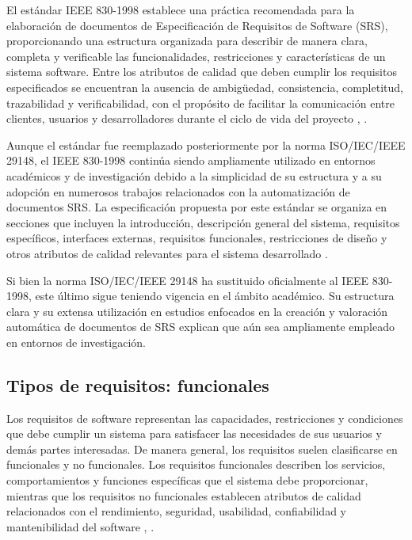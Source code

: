 El estándar IEEE 830-1998 establece una práctica recomendada para la elaboración de documentos de Especificación de Requisitos de Software (SRS), 
proporcionando una estructura organizada para describir de manera clara, completa y verificable las funcionalidades, restricciones y características 
de un sistema software. Entre los atributos de calidad que deben cumplir los requisitos especificados se encuentran la ausencia de ambigüedad, 
consistencia, completitud, trazabilidad y verificabilidad, con el propósito de facilitar la comunicación entre clientes, usuarios y desarrolladores 
durante el ciclo de vida del proyecto \cite{Umar2024}, \cite{Wolf2026}.

Aunque el estándar fue reemplazado posteriormente por la norma ISO/IEC/IEEE 29148, el IEEE 830-1998 continúa siendo ampliamente utilizado en entornos 
académicos y de investigación debido a la simplicidad de su estructura y a su adopción en numerosos trabajos relacionados con la automatización 
de documentos SRS. La especificación propuesta por este estándar se organiza en secciones que incluyen la introducción, descripción general del 
sistema, requisitos específicos, interfaces externas, requisitos funcionales, restricciones de diseño y otros atributos de calidad relevantes para 
el sistema desarrollado \cite{Akhtar2025}.

Si bien la norma ISO/IEC/IEEE 29148 ha sustituido oficialmente al IEEE 830-1998, este último sigue teniendo vigencia en el ámbito académico. 
Su estructura clara y su extensa utilización en estudios enfocados en la creación y valoración automática de documentos de SRS explican que aún sea ampliamente 
empleado en entornos de investigación.

\subsection{Tipos de requisitos: funcionales}

Los requisitos de software representan las capacidades, restricciones y condiciones que debe cumplir un sistema para satisfacer las necesidades 
de sus usuarios y demás partes interesadas. De manera general, los requisitos suelen clasificarse en funcionales y no funcionales. Los requisitos 
funcionales describen los servicios, comportamientos y funciones específicas que el sistema debe proporcionar, mientras que los requisitos no 
funcionales establecen atributos de calidad relacionados con el rendimiento, seguridad, usabilidad, confiabilidad y 
mantenibilidad del software \cite{Wolf2026}, \cite{Umar2024}.

